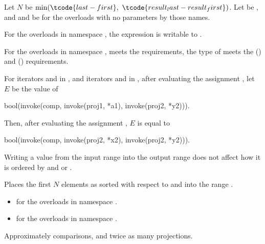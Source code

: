 \begin{itemdescr}
\pnum
Let $N$ be $\min(\tcode{last - first}, \ \tcode{result_last - result_first})$.
Let  be , and
 and  be 
for the overloads with no parameters by those names.

\pnum
\mandates
For the overloads in namespace ,
the expression 
is writable to .

\pnum
\expects
For the overloads in namespace ,
 meets
the  requirements,
the type of  meets
the  () and
 () requirements.

\pnum
\expects
For iterators  and  in , and
iterators  and  in ,
after evaluating the assignment , let $E$ be the value of
\begin{codeblock}
bool(invoke(comp, invoke(proj1, *a1), invoke(proj2, *y2))).
\end{codeblock}
Then, after evaluating the assignment , $E$ is equal to
\begin{codeblock}
bool(invoke(comp, invoke(proj2, *x2), invoke(proj2, *y2))).
\end{codeblock}
\begin{note}
Writing a value from the input range into the output range does not affect
how it is ordered by  and  or .
\end{note}

\pnum
\effects
Places the first $N$ elements
as sorted with respect to  and 
into the range .

\pnum
\returns
\begin{itemize}
\item
   for the overloads in namespace .
\item
   for
  the overloads in namespace .
\end{itemize}

\pnum
\complexity
Approximately  comparisons,
and twice as many projections.
\end{itemdescr}

